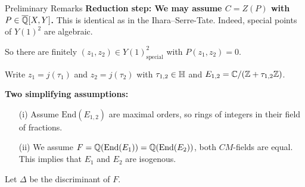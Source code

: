 \documentclass{beamer}
\begin{document}
\begin{frame}{Preliminary Remarks}
  \textbf{Reduction step: We may assume $C=Z(P)$ with $P\in{\overline{\mathbb{Q}}}[X,Y]$.} This
  is identical as in the Ihara--Serre-Tate. Indeed, special points of
  $Y(1)^2$ are algebraic.

  So there are finitely $(z_1,z_2) \in Y(1)^2_{\mathrm{special}}$ with
  $P(z_1,z_2)=0$.

  Write $z_1=j(\tau_1)$ and $z_2=j(\tau_2)$ with $\tau_{1,2}\in{\mathbb{H}}$
  and $E_{1,2} = {\mathbb{C}}/({\mathbb{Z}}+\tau_{1,2}{\mathbb{Z}})$.
  
  \textbf{Two simplifying assumptions:}
  

  \begin{enumerate}
  \item [(i)] Assume $\mathrm{End}(E_{1,2})$ are \alert{maximal
      orders}, so rings of integers in their field of fractions.

  \item[(ii)] We assume $F = {\mathbb{Q}}(\mathrm{End}(E_1)) =
    {\mathbb{Q}}(\mathrm{End}(E_2))$, both $CM$-fields are equal. This implies
    that $E_1$ and $E_2$ are isogenous. 
  \end{enumerate}
  Let $\Delta$ be the
  discriminant of $F$. 
\end{frame}
\end{document}
